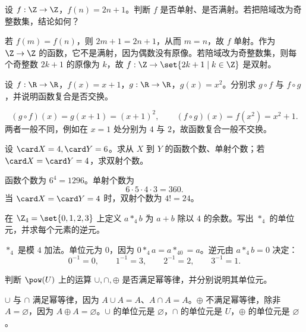 \begin{exercise}[level=advanced]
设 $f:\Z\to\Z$，$f(n)=2n+1$。判断 $f$ 是否单射、是否满射。若把陪域改为奇整数集，结论如何？
\begin{solution}
若 $f(m)=f(n)$，则 $2m+1=2n+1$，从而 $m=n$，故 $f$ 单射。作为 $\Z\to\Z$ 的函数，它不是满射，因为偶数没有原像。若陪域改为奇整数集，则每个奇整数 $2k+1$ 的原像为 $k$，故 $f:\Z\to\set{2k+1\mid k\in\Z}$ 是双射。
\end{solution}
\end{exercise}

\begin{exercise}[level=advanced]
设 $f:\R\to\R$，$f(x)=x+1$，$g:\R\to\R$，$g(x)=x^2$。分别求 $g\circ f$ 与 $f\circ g$，并说明函数复合是否交换。
\begin{solution}
\[
  (g\circ f)(x)=g(x+1)=(x+1)^2,\qquad
  (f\circ g)(x)=f(x^2)=x^2+1.
  \]
  两者一般不同，例如在 $x=1$ 处分别为 $4$ 与 $2$，故函数复合一般不交换。
\end{solution}
\end{exercise}

\begin{exercise}[level=advanced]
设 $\card X=4,\card Y=6$。求从 $X$ 到 $Y$ 的函数个数、单射个数；若 $\card X=\card Y=4$，求双射个数。
\begin{solution}
函数个数为 $6^4=1296$。单射个数为
  \[
  6\cdot5\cdot4\cdot3=360.
  \]
  当 $\card X=\card Y=4$ 时，双射个数为 $4!=24$。
\end{solution}
\end{exercise}

\begin{exercise}[level=advanced]
在 $\Z_4=\set{0,1,2,3}$ 上定义 $a*_4b$ 为 $a+b$ 除以 $4$ 的余数。写出 $*_4$ 的单位元，并求每个元素的逆元。
\begin{solution}
$*_4$ 是模 $4$ 加法。单位元为 $0$，因为 $0*_4a=a*_40=a$。逆元由 $a*_4b=0$ 决定：
  \[
  0^{-1}=0,\qquad 1^{-1}=3,\qquad 2^{-1}=2,\qquad 3^{-1}=1.
  \]
\end{solution}
\end{exercise}

\begin{exercise}[level=advanced]
判断 $\pow(U)$ 上的运算 $\cup,\cap,\oplus$ 是否满足幂等律，并分别说明其单位元。
\begin{solution}
$\cup$ 与 $\cap$ 满足幂等律，因为 $A\cup A=A$、$A\cap A=A$。$\oplus$ 不满足幂等律，除非 $A=\varnothing$，因为 $A\oplus A=\varnothing$。$\cup$ 的单位元是 $\varnothing$，$\cap$ 的单位元是 $U$，$\oplus$ 的单位元是 $\varnothing$。
\end{solution}
\end{exercise}

